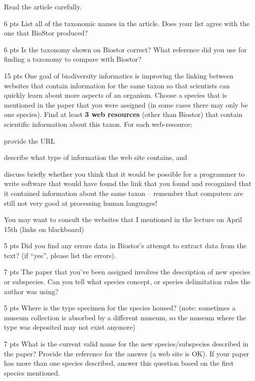 \documentclass[11pt]{article}
\begin{document}
\begin{compactenum}
	\item Read the article carefully.
	\item {\color{red} 6 pts} List all of the taxonomic names in the article. Does your list agree with the one that BioStor produced?
	\item {\color{red} 6 pts} Is the taxonomy shown on Biostor correct? What reference did you use for finding a taxonomy to compare with Biostor?
	\item {\color{red} 15 pts} One goal of biodiversity informatics is improving the linking between websites that contain information for the same taxon so that scientists can quickly learn about more aspects of an organism.  Choose a species that is mentioned in the paper that you were assigned (in some cases there may only be one species).  
	Find at least \textbf{3 web resources} (other than Biostor) that contain scientific information about this taxon.
	For each web-resource:
		\begin{compactenum}
			\item provide the URL
			\item describe what type of information the web site contains, and 
			\item discuss briefly whether you think that it would be possible for a programmer to write software that would have found the link that you found and recognized that it contained information about the same taxon -- remember that computers are still not very good at processing human languages!
		\end{compactenum}
		You may want to consult the websites that I mentioned in the lecture on April 15th (links on blackboard)
	\item {\color{red} 5 pts} Did you find any errors data in Biostor's attempt to extract data from the text?  (if ``yes'', please list the errors).
	\item {\color{red} 7 pts} The paper that you've been assigned involves the description of new species or subspecies.  Can you tell what species concept, or species delimitation rules the author was using?
	\item {\color{red} 5 pts} Where is the type specimen for the species housed? (note: sometimes a museum collection is absorbed by a different museum, so the museum where the type was deposited may not exist anymore)
	\item {\color{red} 7 pts} What is the current valid name for the new species/subspecies described in the paper? Provide the reference for the answer (a web site is OK).  If your paper has more than one species described, answer this question based on the first species mentioned.

\end{compactenum}
\end{document}
